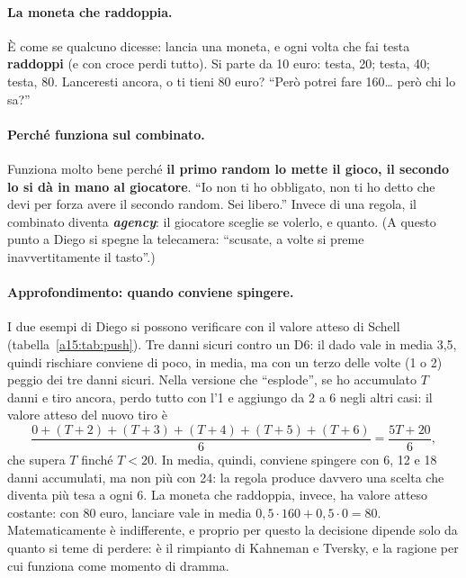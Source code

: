 \paragraph{La moneta che raddoppia.} È come se qualcuno dicesse: lancia una moneta, e ogni
volta che fai testa \textbf{raddoppi} (e con croce perdi tutto). Si parte da 10 euro: testa,
20; testa, 40; testa, 80. Lanceresti ancora, o ti tieni 80 euro? ``Però potrei fare 160\ldots{}
però chi lo sa?''

\paragraph{Perché funziona sul combinato.} Funziona molto bene perché \textbf{il primo random
lo mette il gioco, il secondo lo si dà in mano al giocatore}. ``Io non ti ho obbligato, non ti
ho detto che devi per forza avere il secondo random. Sei libero.'' Invece di una regola, il
combinato diventa \textbf{\emph{agency}}: il giocatore sceglie se volerlo, e quanto. (A questo
punto a Diego si spegne la telecamera: ``scusate, a volte si preme inavvertitamente il tasto''.)

\paragraph{Approfondimento: quando conviene spingere.} I due esempi di Diego si possono
verificare con il valore atteso di Schell (tabella~\ref{a15:tab:push}). Tre danni sicuri contro
un D6: il dado vale in media 3,5, quindi rischiare conviene di poco, in media, ma con un terzo
delle volte (1 o 2) peggio dei tre danni sicuri. Nella versione che ``esplode'', se ho
accumulato $T$ danni e tiro ancora, perdo tutto con l'1 e aggiungo da 2 a 6 negli altri casi:
il valore atteso del nuovo tiro è
\[
  \frac{0 + (T+2) + (T+3) + (T+4) + (T+5) + (T+6)}{6} = \frac{5T + 20}{6},
\]
che supera $T$ finché $T < 20$. In media, quindi, conviene spingere con 6, 12 e 18 danni
accumulati, ma non più con 24: la regola produce davvero una scelta che diventa più tesa a ogni
6. La moneta che raddoppia, invece, ha valore atteso costante: con 80 euro, lanciare vale in
media $0{,}5 \cdot 160 + 0{,}5 \cdot 0 = 80$. Matematicamente è indifferente, e proprio per
questo la decisione dipende solo da quanto si teme di perdere: è il rimpianto di Kahneman e
Tversky, e la ragione per cui funziona come momento di dramma.

